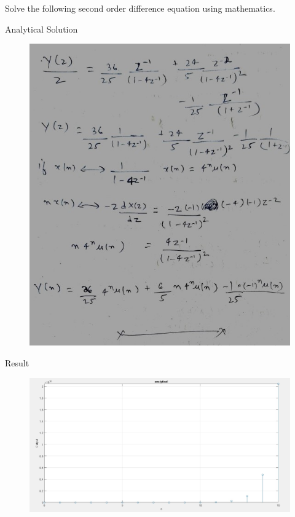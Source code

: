 \documentclass[12pt, letterpaper]{article}
\begin{document}
\begin{section}{Solve the following second order difference equation using mathematics.}
\begin{subsection}{Analytical Solution}
\begin{figure}[!htp]
\begin{center}
\end{center}
\end{figure}
\begin{figure}[!htp]
\begin{center}
\includegraphics[width=1\textwidth]{fig2.jpg}
\end{center}
\end{figure}
\end{subsection}
\begin{subsection}{Result}
\begin{figure}[!htp]
\includegraphics[width=1\textwidth]{fig3.jpg}

\end{figure}
\end{subsection}
\end{section}
\end{document}
